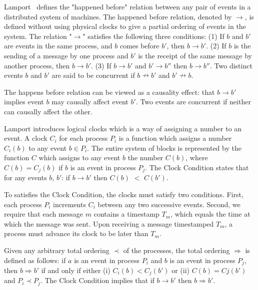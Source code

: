 \documentclass[preprint,12pt]{elsarticle}
\begin{document}
Lamport~\cite{lamport1978time} defines the "happened before" relation between any pair of events in a distributed system of machines. The happened before relation, denoted by $\rightarrow$, is defined without using physical clocks to give a partial ordering of events in the system. The relation "$\rightarrow$" satisfies the following three conditions: (1) If $b$ and $b'$ are events in the same process, and $b$ comes before $b'$, then $b \rightarrow b'$. (2) If $b$ is the sending of a message by one process and $b'$ is the receipt of the same message by another process, then $b \rightarrow b'$. (3) If $b \rightarrow b'$ and $b' \rightarrow b''$ then $b \rightarrow b''$. 
 Two distinct events $b$ and $b'$ are said to be concurrent if $b \nrightarrow b'$ and $b' \nrightarrow b$.

The happens before relation can be viewed as a causality effect: that $b \rightarrow  b'$ implies event $b$ may causally affect event $b'$. Two events are concurrent if neither can causally affect the other.


Lamport introduces logical clocks which is a way of assigning a number to an event. A clock $C_i$ for each process $P_i$ is a function which assigns a number $C_i(b)$ to any event $b \in P_i$. The entire system of blocks is represented by the function $C$ which assigns to any event $b$ the number $C(b)$, where $C(b) = C_j(b)$ if $b$ is an event in process $P_j$.
The Clock Condition states that for any events $b$, $b'$: if $b \rightarrow b'$ then $C(b)$ $<$ $C(b')$. 


To satisfies the Clock Condition, the clocks must satisfy two conditions. First, each process $P_i$ increments $C_i$ between any two successive events. Second, we require that each message $m$ contains a timestamp $T_m$, which equals the time at which the message was sent. Upon receiving a message timestamped $T_m$, a process must advance its clock to be later than $T_m$. 


Given any arbitrary total ordering $\prec$ of the processes, the total ordering $\Rightarrow$ is defined as follows: if $a$ is an event in process $P_i$ and $b$ is an event in process $P_j$, then $b \Rightarrow b'$ if and only if either (i) $C_i(b) < C_j(b')$ or (ii) $C(b)= Cj(b')$ and $P_i \prec P_j$. The Clock Condition implies that if $b \rightarrow b'$ then $b \Rightarrow b'$.
\end{document}

